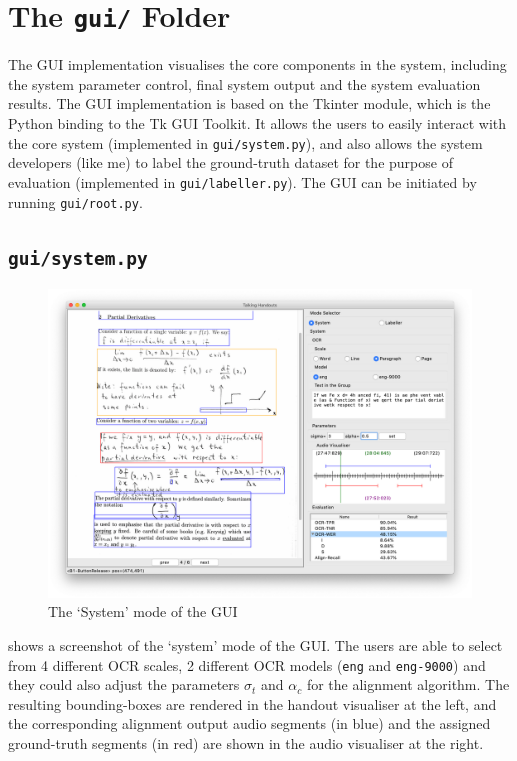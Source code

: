 \section{The \texttt{gui/} Folder}

The GUI implementation visualises the core components in the system, including the system parameter control, final system output and the system evaluation results. The GUI implementation is based on the Tkinter module, which is the Python binding to the Tk GUI Toolkit. It allows the users to easily interact with the core system (implemented in \texttt{gui/system.py}), and also allows the system developers (like me) to label the ground-truth dataset for the purpose of evaluation (implemented in \texttt{gui/labeller.py}). The GUI can be initiated by running \texttt{gui/root.py}.

\subsection{\texttt{gui/system.py}}

\begin{figure}[!ht]
    \centering
    \includegraphics[width=\textwidth]{gui-system.png}
    \caption{The `System' mode of the GUI}
    \label{fig:gui-system}
\end{figure}

 shows a screenshot of the `system' mode of the GUI. The users are able to select from 4 different OCR scales, 2 different OCR models (\texttt{eng} and \texttt{eng-9000}) and they could also adjust the parameters $\sigma_t$ and $\alpha_c$ for the alignment algorithm. The resulting bounding-boxes are rendered in the handout visualiser at the left, and the corresponding alignment output audio segments (in blue) and the assigned ground-truth segments (in red) are shown in the audio visualiser at the right.


